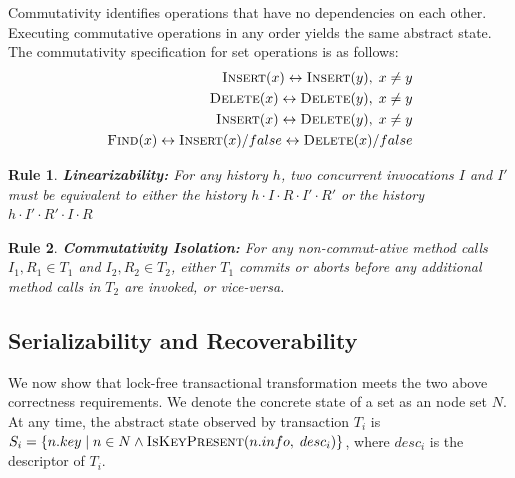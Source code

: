 \documentclass{sig-alternate-05-2015}
\newtheorem{crule}{Rule}
\begin{document}
Commutativity identifies operations that have no dependencies on each other.
Executing commutative operations in any order yields the same abstract state.
The commutativity specification for set operations is as follows:
\begin{equation}
    \label{eq:commute}
\begin{aligned}
    \textsc{Insert}(x) \leftrightarrow \textsc{Insert}(y),\;x \ne y \\
    \textsc{Delete}(x) \leftrightarrow \textsc{Delete}(y),\;x \ne y \\
    \textsc{Insert}(x) \leftrightarrow \textsc{Delete}(y),\;x \ne y \\
    \textsc{Find}(x) \leftrightarrow \textsc{Insert}(x)/false \leftrightarrow \textsc{Delete}(x)/false
\end{aligned}
\end{equation}

\begin{crule}
    \textbf{Linearizability:} For any history $h$, two concurrent invocations $I$ and $I'$ must be equivalent to either the history $h \cdot I \cdot R \cdot I' \cdot R'$ or the history $h \cdot I' \cdot R' \cdot I \cdot R$
\end{crule}

\begin{crule}
    \textbf{Commutativity Isolation:} For any non-commut-ative method calls $I_1,R_1 \in T_1$ and $I_2,R_2 \in T_2$, either $T_1$ commits or aborts before any additional method calls in $T_2$ are invoked, or vice-versa.
\end{crule}


\subsection{Serializability and Recoverability}
We now show that lock-free transactional transformation meets the two above correctness requirements. 
We denote the concrete state of a set as an node set $N$.
At any time, the abstract state observed by transaction $T_i$ is $S_i = \{n.key\;|\;n \in N \land \textsc{IsKeyPresent}(n.info,\;desc_i)\}$, where $desc_i$ is the descriptor of $T_i$.
\end{document}
